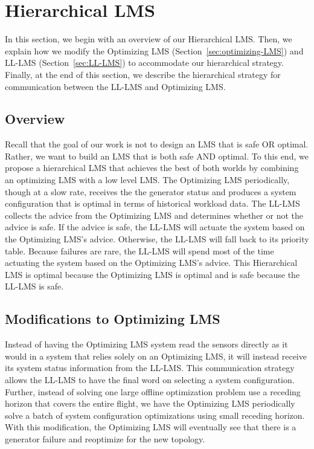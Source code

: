 \documentclass{acm_proc_article-sp}
\begin{document}
\section{Hierarchical LMS}
In this section, we begin with an overview of our Hierarchical LMS.
Then, we explain how we modify the Optimizing LMS (Section~\ref{sec:optimizing-LMS}) and LL-LMS (Section~\ref{sec:LL-LMS}) to accommodate our hierarchical strategy.
Finally, at the end of this section, we describe the hierarchical strategy for communication between the LL-LMS and Optimizing LMS.

\subsection{Overview}
Recall that the goal of our work is not to design an LMS that is safe OR optimal. 
Rather, we want to build an LMS that is both safe AND optimal. 
To this end, we propose a hierarchical LMS that achieves the best of both worlds by combining an optimizing LMS with a low level LMS. The Optimizing LMS periodically, though at a slow rate, receives the the generator status and produces a system configuration that is optimal in terms of historical workload data. 
The LL-LMS collects the advice from the Optimizing LMS and determines whether or not the advice is safe. 
If the advice is safe, the LL-LMS will actuate the system based on the Optimizing LMS's advice. 
Otherwise, the LL-LMS will fall back to its priority table. 
Because failures are rare, the LL-LMS will spend most of the time actuating the system based on the Optimizing LMS's advice. 
This Hierarchical LMS is optimal because the Optimizing LMS is optimal and is safe because the LL-LMS is safe.

\subsection{Modifications to Optimizing LMS}
Instead of having the Optimizing LMS system read the sensors directly as it would in a system that relies solely on an Optimizing LMS, it will instead receive its system status information from the LL-LMS. 
This communication strategy allows the LL-LMS to have the final word on selecting a system configuration.
Further, instead of solving one large offline optimization problem use a receding horizon that covers the entire flight, we have the Optimizing LMS periodically solve a batch of system configuration optimizations using small receding horizon.
With this modification, the Optimizing LMS will eventually see that there is a generator failure and reoptimize for the new topology.
\end{document}
